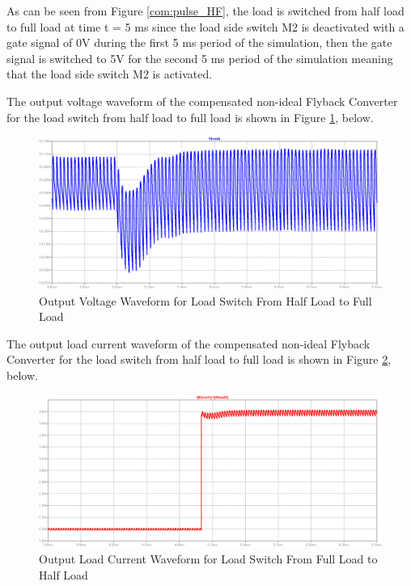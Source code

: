 As can be seen from Figure \ref{com:pulse_HF}, the load is switched from half load to full load at time t = 5 ms since the load side switch M2 is deactivated with a gate signal of 0V during the first 5 ms period of the simulation, then the gate signal is switched to 5V for the second 5 ms period of the simulation meaning that the load side switch M2 is activated.

The output voltage waveform of the compensated non-ideal Flyback Converter for the load switch from half load to full load is shown in Figure \ref{com:Vout_HF}, below.

\begin{figure}[H]
\begin{center}
\includegraphics[width=1\textwidth]{comp_simulations/Vout_HF.png}
\caption{Output Voltage Waveform for Load Switch From Half Load to Full Load}
\label{com:Vout_HF}
\end{center}
\end{figure}

The output load current waveform of the compensated non-ideal Flyback Converter for the load switch from half load to full load is shown in Figure \ref{com:Iload_HF}, below.

\begin{figure}[H]
\begin{center}
\includegraphics[width=1\textwidth]{comp_simulations/Iload_HF.png}
\caption{Output Load Current Waveform for Load Switch From Full Load to Half Load}
\label{com:Iload_HF}
\end{center}
\end{figure}

